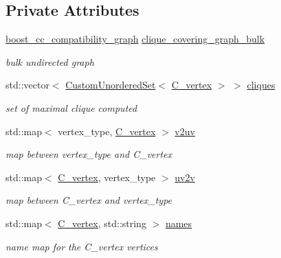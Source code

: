 \subsection*{Private Attributes}
\begin{DoxyCompactItemize}
\item 
\hyperlink{clique__covering__graph_8hpp_af47b1c28cf9a2c360afafb8d80582ce6}{boost\+\_\+cc\+\_\+compatibility\+\_\+graph} \hyperlink{classbipartite__matching__clique__covering_a565ab2aa76a42faf6d911e6e2cba34c4}{clique\+\_\+covering\+\_\+graph\+\_\+bulk}
\begin{DoxyCompactList}\small\item\em bulk undirected graph \end{DoxyCompactList}\item 
std\+::vector$<$ \hyperlink{classCustomUnorderedSet}{Custom\+Unordered\+Set}$<$ \hyperlink{clique__covering__graph_8hpp_a9cb45047ea8c5ed95a8cfa90494345aa}{C\+\_\+vertex} $>$ $>$ \hyperlink{classbipartite__matching__clique__covering_a3081b6c815f70097fa13c8953dfdf3d6}{cliques}
\begin{DoxyCompactList}\small\item\em set of maximal clique computed \end{DoxyCompactList}\item 
std\+::map$<$ vertex\+\_\+type, \hyperlink{clique__covering__graph_8hpp_a9cb45047ea8c5ed95a8cfa90494345aa}{C\+\_\+vertex} $>$ \hyperlink{classbipartite__matching__clique__covering_a4b96f7869c9defa1da37bece4f3b5947}{v2uv}
\begin{DoxyCompactList}\small\item\em map between vertex\+\_\+type and C\+\_\+vertex \end{DoxyCompactList}\item 
std\+::map$<$ \hyperlink{clique__covering__graph_8hpp_a9cb45047ea8c5ed95a8cfa90494345aa}{C\+\_\+vertex}, vertex\+\_\+type $>$ \hyperlink{classbipartite__matching__clique__covering_a449b4e9304a7a73d89e0c10bbe9e776e}{uv2v}
\begin{DoxyCompactList}\small\item\em map between C\+\_\+vertex and vertex\+\_\+type \end{DoxyCompactList}\item 
std\+::map$<$ \hyperlink{clique__covering__graph_8hpp_a9cb45047ea8c5ed95a8cfa90494345aa}{C\+\_\+vertex}, std\+::string $>$ \hyperlink{classbipartite__matching__clique__covering_a56d2fa9ed7b117a333fb86450d35fca9}{names}
\begin{DoxyCompactList}\small\item\em name map for the C\+\_\+vertex vertices \end{DoxyCompactList}\item 

\end{DoxyCompactItemize}
